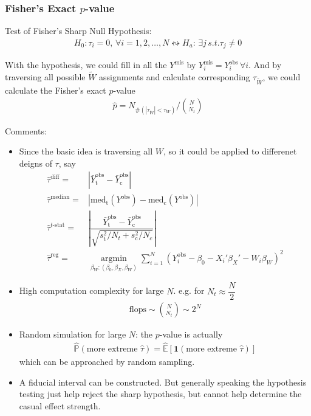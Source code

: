 \subsubsection{Fisher's Exact $ p $-value}

Test of Fisher's Sharp Null Hypothesis:
\begin{align*}
    H_0:\tau_i=0,\,\forall i=1,2,\ldots,N  \leftrightsquigarrow H_a:\,\exists j\,s.t. \tau_j\neq 0
\end{align*}

With the hypothesis, we could fill in all the $ Y^\mathrm{mis}  $ by $ Y^\mathrm{mis}_i=Y^\mathrm{obs}_i   \,\forall i$. And by traversing all possible $ \tilde{W} $ assignments and calculate corresponding $ \tau_{\tilde{W}} $, we could calculate the Fisher's exact $ p $-value
\begin{align*}
     \hat{p}=N_{\#(|\tau_{\tilde{W}}|<\tau_{W})}\bigg/\binom{N}{N_t}
\end{align*}

Comments:
\begin{itemize}[topsep=2pt,itemsep=0pt]
    \item Since the basic idea is traversing all $ W $, so it could be applied to differenet deigns of $ \tau $, say 
    \begin{align*}
        \hat{\tau}^\mathrm{diff}=&|\bar{Y}_\mathrm{t}^\mathrm{obs}-\bar{Y}_\mathrm{c}^\mathrm{obs}|\\
        \hat{\tau}^\mathrm{median}=&|\mathrm{med}_\mathrm{t}(Y^\mathrm{obs} )-\mathrm{med}_\mathrm{c}(Y^\mathrm{obs} )    |  \\
        \hat{\tau}^{t\text{-}\mathrm{stat} }=&\left\vert \dfrac{\bar{Y}_\mathrm{t}^\mathrm{obs}-\bar{Y}_\mathrm{c}^\mathrm{obs}}{\sqrt{ s_\mathrm{t}^2/N_t+s_\mathrm{c}^2/N_c   }} \right\vert \\
        \hat{\tau}^\mathrm{reg}=&\mathop{\arg\min}\limits_{\beta _W:(\beta _0,\beta _X,\beta _W)}\sum_{i=1}^N\left(Y_i^{\mathrm{obs}}-\beta _0-X_i'\beta _X'-W_i\beta _W\right)^2  
    \end{align*}
    \item High computation complexity for large $ N $. e.g. for $ N_t\approx \dfrac{N}{2} $
    \begin{align*}
        \mathrm{flops}\sim \binom{N}{N_t}\sim 2^N 
    \end{align*}
    \item Random simulation for large $ N $: the $ p $-value is actually
    \begin{align*}
        \hat{\mathbb{P}}\left( \text{more extreme }\hat{\tau} \right)=\hat{\mathbb{E}}\left[\mathbf{1}(\text{more extreme }\hat{\tau})\right] 
    \end{align*}
    which can be approached by random sampling.
    \item A fiducial interval can be constructed. But generally speaking the hypothesis testing just help reject the sharp hypothesis, but cannot help determine the casual effect strength.
\end{itemize}

